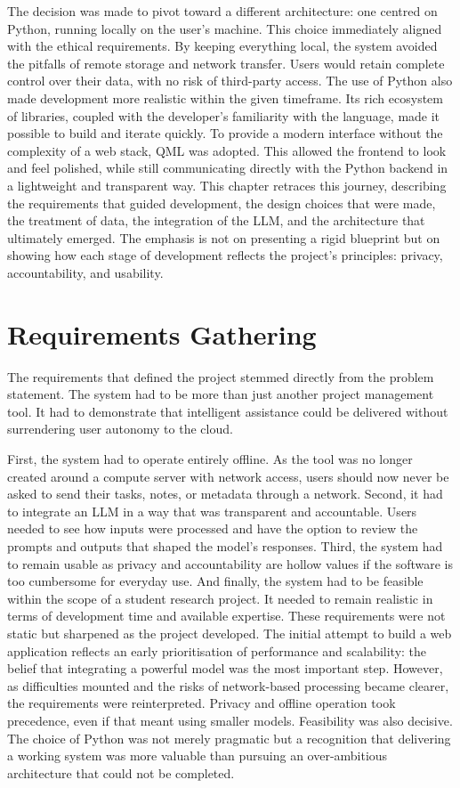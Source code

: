 \documentclass{report}
\begin{document}
The decision was made to pivot toward a different architecture: one centred on Python, running locally on the user's machine. 
This choice immediately aligned with the ethical requirements. 
By keeping everything local, the system avoided the pitfalls of remote storage and network transfer.
Users would retain complete control over their data, with no risk of third-party access. 
The use of Python also made development more realistic within the given timeframe. 
Its rich ecosystem of libraries, coupled with the developer's familiarity with the language, made it possible to build and iterate quickly. 
To provide a modern interface without the complexity of a web stack, QML was adopted. 
This allowed the frontend to look and feel polished, while still communicating directly with the Python backend in a lightweight and transparent way.
This chapter retraces this journey, describing the requirements that guided development, the design choices that were made, the treatment of data, the integration of the LLM, and the architecture that ultimately emerged. 
The emphasis is not on presenting a rigid blueprint but on showing how each stage of development reflects the project's principles: privacy, accountability, and usability.

\section{Requirements Gathering}

The requirements that defined the project stemmed directly from the problem statement. 
The system had to be more than just another project management tool. 
It had to demonstrate that intelligent assistance could be delivered without surrendering user autonomy to the cloud. 

First, the system had to operate entirely offline. As the tool was no longer created around a compute server with network access, users should now never be asked to send their tasks, notes, or metadata through a network. 
Second, it had to integrate an LLM in a way that was transparent and accountable. 
Users needed to see how inputs were processed and have the option to review the prompts and outputs that shaped the model's responses. 
Third, the system had to remain usable as privacy and accountability are hollow values if the software is too cumbersome for everyday use. 
And finally, the system had to be feasible within the scope of a student research project. It needed to remain realistic in terms of development time and available expertise.
These requirements were not static but sharpened as the project developed. The initial attempt to build a web application reflects an early prioritisation of performance and scalability: the belief that integrating a powerful model was the most important step. 
However, as difficulties mounted and the risks of network-based processing became clearer, the requirements were reinterpreted. 
Privacy and offline operation took precedence, even if that meant using smaller models. 
Feasibility was also decisive. The choice of Python was not merely pragmatic but a recognition that delivering a working system was more valuable than pursuing an over-ambitious architecture that could not be completed.
\end{document}
